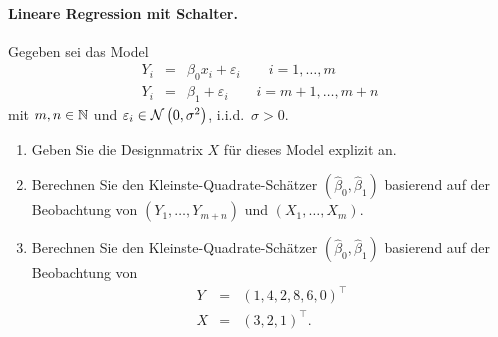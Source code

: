 \paragraph{Lineare Regression mit Schalter.} Gegeben sei das Model
\begin{eqnarray}
    Y_i &=&  \beta_0 x_i + \varepsilon_i \quad\quad i=1,\ldots ,m \\
    Y_i &=& \beta_1 + \varepsilon_i \quad\quad  i=m+1, \ldots , m+n
\end{eqnarray}
mit $m,n \in \mathbb N$ und $\varepsilon_i \in \mathcal N \left( 0, \sigma^2 \right)$, i.i.d.\ $\sigma>0$.
\begin{enumerate}
    \item Geben Sie die Designmatrix $X$ für dieses Model explizit an.
    \item Berechnen Sie den Kleinste-Quadrate-Schätzer $\left( \hat \beta_0, \hat \beta_1 \right)$ 
        basierend auf der Beobachtung von  
        $\left( Y_1, \ldots , Y_{m+n} \right)$ und $\left( X_1, \ldots , X_m \right)$.
    \item Berechnen Sie den Kleinste-Quadrate-Schätzer $\left( \hat \beta_0, \hat \beta_1 \right)$ basierend auf 
        der Beobachtung von
        \begin{eqnarray}
            Y &=&  \left( 1,4,2,8,6,0 \right)^\top \\
            X &=& \left( 3,2,1 \right)^\top.
        \end{eqnarray}
\end{enumerate}

